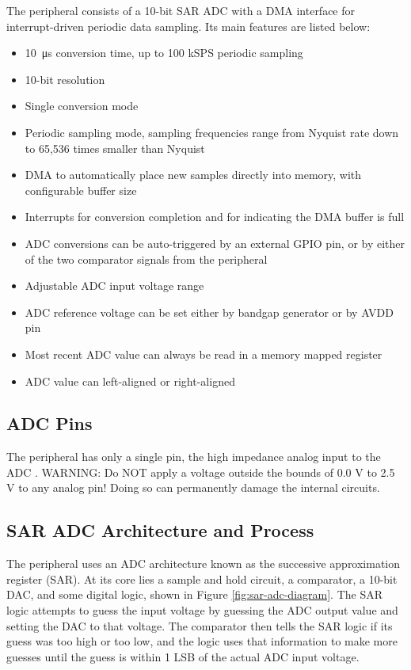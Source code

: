 The  peripheral consists of a 10-bit SAR ADC with a DMA interface for interrupt-driven periodic data sampling. Its main features are listed below:

\begin{itemize}
	\item 10~\si{\micro\second} conversion time, up to 100 kSPS periodic sampling
	\item 10-bit resolution
	\item Single conversion mode
	\item Periodic sampling mode, sampling frequencies range from Nyquist rate down to 65,536 times smaller than Nyquist
	\item DMA to automatically place new samples directly into memory, with configurable buffer size
	\item Interrupts for conversion completion and for indicating the DMA buffer is full
	\item ADC conversions can be auto-triggered by an external GPIO pin, or by either of the two comparator signals from the  peripheral
	\item Adjustable ADC input voltage range
	\item ADC reference voltage can be set either by bandgap generator or by AVDD pin
	\item Most recent ADC value can always be read in a memory mapped register
	\item ADC value can left-aligned or right-aligned
\end{itemize}



\subsection{ADC Pins}

The  peripheral has only a single pin, the high impedance analog input to the ADC . WARNING: Do NOT apply a voltage outside the bounds of 0.0 V to 2.5 V to any analog pin! Doing so can permanently damage the internal circuits.



\subsection{SAR ADC Architecture and Process}

The  peripheral uses an ADC architecture known as the successive approximation register (SAR). At its core lies a sample and hold circuit, a comparator, a 10-bit DAC, and some digital logic, shown in Figure \ref{fig:sar-adc-diagram}. The SAR logic attempts to guess the input voltage by guessing the ADC output value and setting the DAC to that voltage. The comparator then tells the SAR logic if its guess was too high or too low, and the logic uses that information to make more guesses until the guess is within 1 LSB of the actual ADC input voltage.

